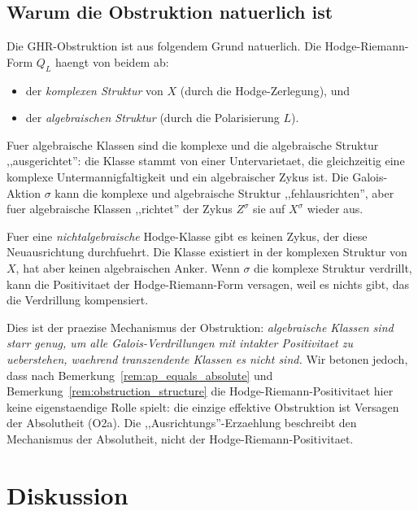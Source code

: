 \documentclass[aps,prd,twocolumn,superscriptaddress,nofootinbib]{revtex4-2}
\theoremstyle{definition}
\theoremstyle{remark}
\begin{document}
\subsection{Warum die Obstruktion natuerlich ist}

Die GHR-Obstruktion ist aus folgendem Grund natuerlich. Die Hodge-Riemann-Form $Q_L$ haengt von beidem ab:
\begin{itemize}
\item der \textit{komplexen Struktur} von $X$ (durch die Hodge-Zerlegung), und
\item der \textit{algebraischen Struktur} (durch die Polarisierung $L$).
\end{itemize}

Fuer algebraische Klassen sind die komplexe und die algebraische Struktur ,,ausgerichtet'': die Klasse stammt von einer Untervarietaet, die gleichzeitig eine komplexe Untermannigfaltigkeit und ein algebraischer Zykus ist. Die Galois-Aktion $\sigma$ kann die komplexe und algebraische Struktur ,,fehlausrichten'', aber fuer algebraische Klassen ,,richtet'' der Zykus $Z^\sigma$ sie auf $X^\sigma$ wieder aus.

Fuer eine \textit{nichtalgebraische} Hodge-Klasse gibt es keinen Zykus, der diese Neuausrichtung durchfuehrt. Die Klasse existiert in der komplexen Struktur von $X$, hat aber keinen algebraischen Anker. Wenn $\sigma$ die komplexe Struktur verdrillt, kann die Positivitaet der Hodge-Riemann-Form versagen, weil es nichts gibt, das die Verdrillung kompensiert.

Dies ist der praezise Mechanismus der Obstruktion: \textit{algebraische Klassen sind starr genug, um alle Galois-Verdrillungen mit intakter Positivitaet zu ueberstehen, waehrend transzendente Klassen es nicht sind.} Wir betonen jedoch, dass nach Bemerkung~\ref{rem:ap_equals_absolute} und Bemerkung~\ref{rem:obstruction_structure} die Hodge-Riemann-Positivitaet hier keine eigenstaendige Rolle spielt: die einzige effektive Obstruktion ist Versagen der Absolutheit (O2a). Die ,,Ausrichtungs''-Erzaehlung beschreibt den Mechanismus der Absolutheit, nicht der Hodge-Riemann-Positivitaet.


\section{Diskussion}
\label{sec:discussion}
\end{document}
